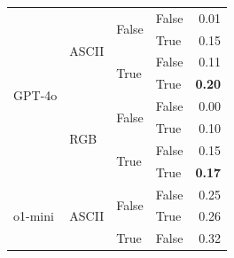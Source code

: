 \begin{tabular}{@{}llllr@{}}
    \midrule                                                                                                                                                   
    \multirow[c]{8}{*}{GPT-4o}                                          & \multirow[c]{4}{*}{ASCII} & \multirow[c]{2}{*}{False} & False                     & 0.01 \\
                                                                        &                           &                           & True                      & 0.15 \\
                                                                        &                           & \multirow[c]{2}{*}{True}  & False                     & 0.11 \\
                                                                        &                           &                           & True                      & \textbf{0.20} \\
    \cmidrule{2-5}                                                                                                                                             
                                                                        & \multirow[c]{4}{*}{RGB}   & \multirow[c]{2}{*}{False} & False                     & 0.00 \\
                                                                        &                           &                           & True                      & 0.10 \\
                                                                        &                           & \multirow[c]{2}{*}{True}  & False                     & 0.15 \\
                                                                        &                           &                           & True                      & \textbf{0.17} \\
    \midrule                                                                                                                                                   
    \multirow[c]{4}{*}{o1-mini}                                         & \multirow[c]{4}{*}{ASCII} & \multirow[c]{2}{*}{False} & False                     & 0.25 \\
                                                                        &                           &                           & True                      & 0.26 \\
                                                                        &                           & \multirow[c]{2}{*}{True}  & False                     & 0.32 \\

\end{tabular}
